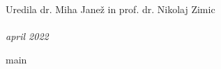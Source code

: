 \documentclass[graybox, envcountchap]{svmult}
\begin{document}
\large Uredila dr. Miha Janež in prof. dr. Nikolaj Zimic\\
\\
\normalsize \emph{april 2022}






\tableofcontents




{main}

%





\backmatter





\end{document}
